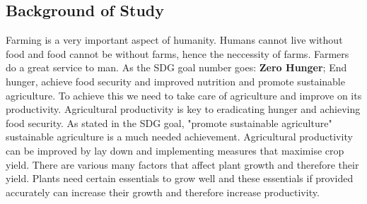 \documentclass[12pt, a4paper]{article}
\begin{document}
\subsection{Background of Study}
Farming is a very important aspect of humanity. Humans cannot live without food and food cannot be without farms, hence the neccessity of farms. Farmers do a great service to man. As the SDG goal number goes: \textbf{Zero Hunger}; End hunger, achieve food security and improved nutrition and promote sustainable agriculture. To achieve this we need to take care of agriculture and improve on its productivity. Agricultural productivity is key to eradicating hunger and achieving food security. As stated in the SDG goal, "promote sustainable agriculture" sustainable agriculture is a much needed achievement. Agricultural productivity can be improved by lay down and implementing measures that maximise crop yield. There are various many factors that affect plant growth and therefore their yield. Plants need certain essentials to grow well and these essentials if provided accurately can increase their growth and therefore increase productivity.
\\
\end{document}

